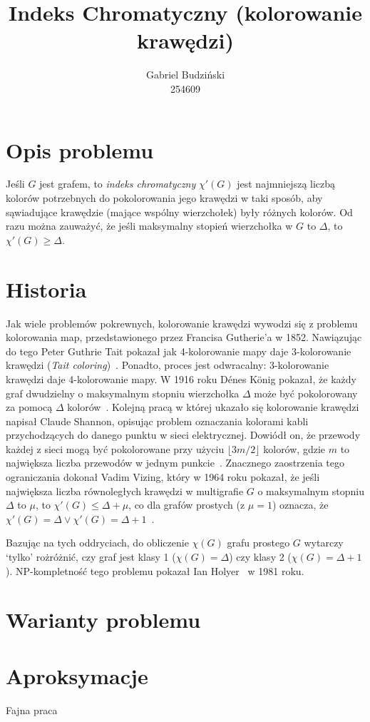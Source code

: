 \documentclass[12pt]{article}
\title{Indeks Chromatyczny (kolorowanie krawędzi)}
\author{Gabriel Budziński\\254609}
\begin{document}
\maketitle

\section{Opis problemu}

Jeśli $G$ jest grafem, to \textit{indeks chromatyczny} $\chi'(G)$ jest najmniejszą liczbą kolorów potrzebnych do pokolorowania jego krawędzi w taki sposób, aby sąwiadujące krawędzie (mające wspólny wierzchołek) były różnych kolorów. Od razu można zauważyć, że jeśli maksymalny stopień wierzchołka w $G$ to $\Delta$, to $\chi'(G) \geq \Delta$.

\section{Historia}

Jak wiele problemów pokrewnych, kolorowanie krawędzi wywodzi się z problemu kolorowania map, przedstawionego przez Francisa Gutherie'a w 1852. Nawiązując do tego Peter Guthrie Tait pokazał jak 4-kolorowanie mapy daje 3-kolorowanie krawędzi (\textit{Tait coloring})~\cite{tait_1880}. Ponadto, proces jest odwracalny: 3-kolorowanie krawędzi daje 4-kolorowanie mapy. W 1916 roku Dénes König pokazał, że każdy graf dwudzielny o maksymalnym stopniu wierzchołka $\Delta$ może być pokolorowany za pomocą $\Delta$ kolorów~\cite{König1916}. Kolejną pracą w której ukazało się kolorowanie krawędzi napisał Claude Shannon, opisując problem oznaczania kolorami kabli przychodzących do danego punktu w sieci elektrycznej. Dowiódł on, że przewody każdej z sieci mogą być pokolorowane przy użyciu $\lfloor 3m/2 \rfloor$ kolorów, gdzie $m$ to największa liczba przewodów w jednym punkcie~\cite{Shannon1949ATO}. Znacznego zaostrzenia tego ograniczania dokonał Vadim Vizing, który w 1964 roku pokazał, że jeśli największa liczba równoległych krawędzi w multigrafie $G$ o maksymalnym stopniu $\Delta$ to $\mu$, to $\chi'(G) \leq \Delta + \mu$, co dla grafów prostych (z $\mu = 1$) oznacza, że $\chi'(G) = \Delta \lor \chi'(G) = \Delta + 1$~\cite{1571980075458819456}.

Bazując na tych oddryciach, do obliczenie $\chi(G)$ grafu prostego $G$ wytarczy `tylko' rożróżnić, czy graf jest klasy 1 ($\chi(G) = \Delta$) czy klasy 2 ($\chi(G) = \Delta + 1$). NP-kompletność tego problemu pokazał Ian Holyer~\cite{Holyer1981TheNO} w 1981 roku.

\section{Warianty problemu}

\section{Aproksymacje}

Fajna praca~\cite{Nakano1995}



\end{document}
